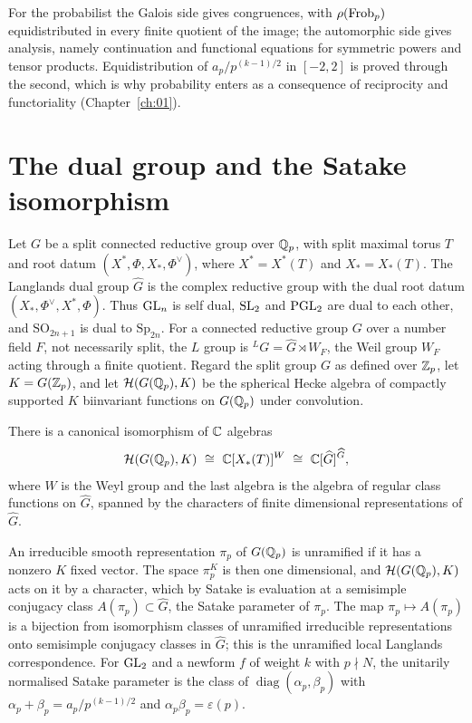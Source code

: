 For the probabilist the Galois side gives congruences, with $\rho(\operatorname{Frob}_p)$ equidistributed in every finite quotient of the image; the automorphic side gives analysis, namely continuation and functional equations for symmetric powers and tensor products. Equidistribution of $a_p/p^{(k-1)/2}$ in $[-2,2]$ is proved through the second, which is why probability enters as a consequence of reciprocity and functoriality (Chapter~\ref{ch:01}).

\section{The dual group and the Satake isomorphism}\label{sec:ch3dual}

Let $G$ be a split connected reductive group over $\mathbb{Q}_p$, with split maximal torus $T$ and root datum $(X^*,\Phi,X_*,\Phi^\vee)$, where $X^*=X^*(T)$ and $X_*=X_*(T)$. The Langlands dual group $\widehat G$ is the complex reductive group with the dual root datum $(X_*,\Phi^\vee,X^*,\Phi)$. Thus $\mathrm{GL}_n$ is self dual, $\mathrm{SL}_2$ and $\mathrm{PGL}_2$ are dual to each other, and $\mathrm{SO}_{2n+1}$ is dual to $\mathrm{Sp}_{2n}$. For a connected reductive group $G$ over a number field $F$, not necessarily split, the $L$ group is ${}^LG=\widehat G\rtimes W_F$, the Weil group $W_F$ acting through a finite quotient. Regard the split group $G$ as defined over $\mathbb{Z}_p$, let $K=G(\mathbb{Z}_p)$, and let $\mathcal{H}(G(\mathbb{Q}_p),K)$ be the spherical Hecke algebra of compactly supported $K$ biinvariant functions on $G(\mathbb{Q}_p)$ under convolution.

\begin{theorem}\label{thm:ch3satake}
There is a canonical isomorphism of $\mathbb{C}$ algebras
\[
\mathcal{H}(G(\Q_p),K)\ \cong\ \C[X_*(T)]^{W}\ \cong\ \C[\widehat G]^{\widehat G},
\]
where $W$ is the Weyl group and the last algebra is the algebra of regular class functions on $\widehat G$, spanned by the characters of finite dimensional representations of $\widehat G$.
\end{theorem}

An irreducible smooth representation $\pi_p$ of $G(\mathbb{Q}_p)$ is unramified if it has a nonzero $K$ fixed vector. The space $\pi_p^K$ is then one dimensional, and $\mathcal{H}(G(\mathbb{Q}_p),K)$ acts on it by a character, which by Satake is evaluation at a semisimple conjugacy class $A(\pi_p)\subset\widehat G$, the Satake parameter of $\pi_p$. The map $\pi_p\mapsto A(\pi_p)$ is a bijection from isomorphism classes of unramified irreducible representations onto semisimple conjugacy classes in $\widehat G$; this is the unramified local Langlands correspondence. For $\mathrm{GL}_2$ and a newform $f$ of weight $k$ with $p\nmid N$, the unitarily normalised Satake parameter is the class of $\operatorname{diag}(\alpha_p,\beta_p)$ with $\alpha_p+\beta_p=a_p/p^{(k-1)/2}$ and $\alpha_p\beta_p=\varepsilon(p)$.

